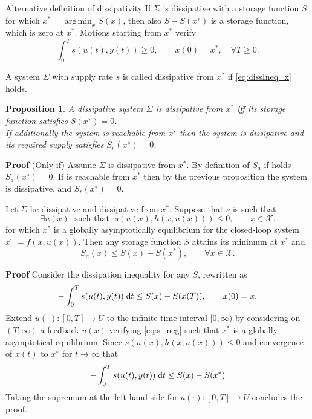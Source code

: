 \documentclass[aspectratio=169]{beamer}
\DeclareMathOperator*{\argmin}{arg\,min}
\newtheorem{proposition}{Proposition}
\begin{document}
\begin{frame}{Alternative definition of dissipativity}
If $\Sigma$ is dissipative with a storage function $S$ for which $x^* = \argmin_x S(x)$, then also $S -S(x^∗)$ is a storage function, which is zero at $x^*$. Motions starting from $x^*$ verify
\begin{equation}\label{eq:dissIneq_x}
\int_{0}^{T} s(u(t), y(t)) \ge 0, \qquad x(0) = x^*, \quad \forall T \ge 0. 
\end{equation}
\begin{definition}
	A system $\Sigma$ with supply rate $s$ is called dissipative from $x^*$ if \eqref{eq:dissIneq_x} holds.
\end{definition}

\begin{proposition}
	A dissipative system $\Sigma$ is dissipative from $x^*$ iff its storage function satisfies $S(x^∗)=0$. \\
	If additionally the system is reachable from $x^∗$ then the
	system is dissipative and its required supply satisfies $S_r(x^∗) = 0$.
\end{proposition}
\textbf{Proof} (Only if) Assume $\Sigma$ is dissipative from $x^*$. By definition of $S_a$ if holds  $S_a(x^∗) = 0$. If is reachable from $x^*$ then by the previous proposition the system is dissipative, and $S_r(x^∗) = 0$.

\end{frame}

\begin{frame}
	\begin{theorem}
		Let $\Sigma$ be dissipative and dissipative from $x^*$. Suppose that $s$ is such that 
		\begin{equation}\label{eq:s_neg}
		\exists u(x) \; \text{  such that  } \;	s(u(x), h(x,u(x))) \le 0, \qquad x \in \mathcal{X}.
		\end{equation}
		for which $x^*$ is a globally asymptotically equilibrium for the closed-loop system $\dot{x}̇ = f (x, u(x))$. Then any storage function $S$ attains its minimum at $x^*$ and 
		\begin{equation*}
			S_a(x) \le S(x) - S(x^*), \qquad \forall x \in \mathcal{X}.
		\end{equation*}
	\end{theorem}

\textbf{Proof} Consider the dissipation inequality for any $S$, rewritten as
\begin{equation*}
	-\int_0^T s(u(t), y(t)) \d t\le S(x) - S(x(T)), \qquad x(0) = x.
\end{equation*}
Extend $u(\cdot) : [0, T] \rightarrow U$ to the infinite time interval $[0, \infty)$ by
considering on $(T, \infty)$ a feedback $u(x)$ verifying \eqref{eq:s_neg} such that $x^*$ is a globally asymptotical equilibrium. Since $s(u(x), h(x,u(x))) \le 0$ and convergence of $x(t)$ to $x^∗$ for $t \rightarrow \infty$ that
\begin{equation*}
	-\int_0^T s(u(t), y(t)) \d t\le S(x) - S(x^*)
\end{equation*}
Taking the supremum at the left-hand side for $u(\cdot) : [0, T] \rightarrow U$ concludes the proof.
	
\end{frame}
\end{document}
